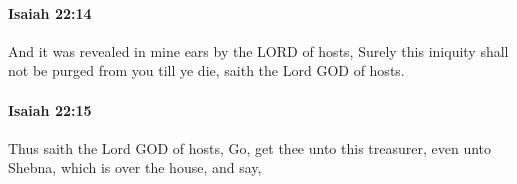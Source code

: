 		\paragraph{Isaiah 22:14} %
			\label{ISAIAH-22-14}

			And it was revealed in mine ears by the LORD of hosts, Surely this iniquity shall not be purged from you till ye die, saith the Lord GOD of hosts.


		\paragraph{Isaiah 22:15} %
			\label{ISAIAH-22-15}

			Thus saith the Lord GOD of hosts, Go, get thee unto this treasurer, even unto Shebna, which is over the house, and say,


